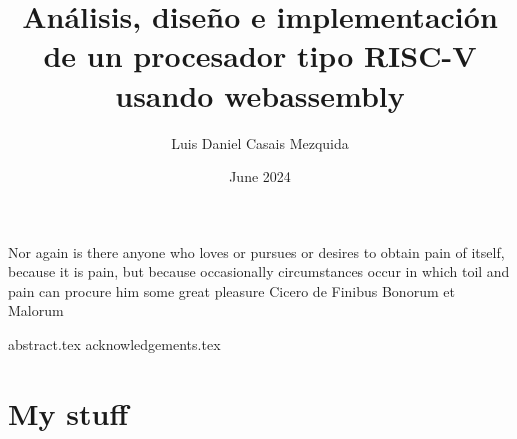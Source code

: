 \documentclass[en]{uc3mthesisIEEE}
\begin{document}
  \subject{Subject}
  \author{Luis Daniel Casais Mezquida}
  \title{Análisis, diseño e implementación de un procesador tipo RISC-V usando webassembly}
  \date{June 2024}



  \maketitle

  \pagestyle{noheader}

  \makeepigraph
    {Nor again is there anyone who loves or pursues or desires to obtain pain of itself, because it is pain, but because occasionally circumstances occur in which toil and pain can procure him some great pleasure}  %
    {Cicero}  %
    {de Finibus Bonorum et Malorum}  %


  {abstract.tex}
  {acknowledgements.tex}

  \tableofcontents
  \listoffigures
  \listoftables


  \clearpage
  \pagestyle{fancy}


  \newpage


  \makebibliography


  \startappendix

  \chapter{My stuff}
  \lipsum
\end{document}
